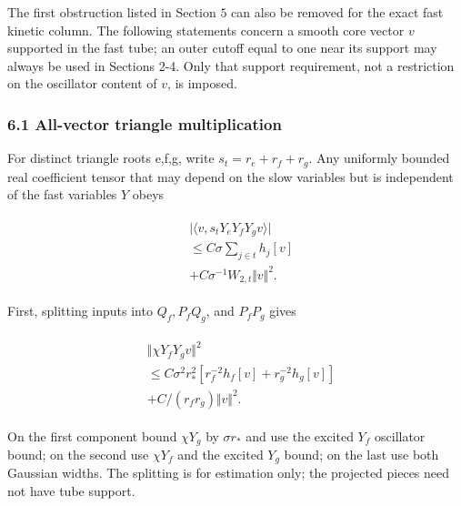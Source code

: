 The first obstruction listed in Section \(5\) can also be removed for
the exact fast kinetic column. The following statements concern a smooth
core vector \(v\) supported in the fast tube; an outer cutoff equal to
one near its support may always be used in Sections 2-4. Only that
support requirement, not a restriction on the oscillator content of
\(v\), is imposed.

\subsubsection{6.1 All-vector triangle
multiplication}\label{e-all-vector-triangle-multiplication}

For distinct triangle roots e,f,g, write \(s_{t}=r_{e}+r_{f}+r_{g}\).
Any uniformly bounded real coefficient tensor that may depend on the
slow variables but is independent of the fast variables \(Y\) obeys

\begin{gather*}
\begin{aligned}
& \vert \langle v,s_{t} Y_{e} Y_{f} Y_{g} v\rangle \vert \\
& \le  C \sigma  \sum _{j \in  t} h_{j}[v] \\
& + C \sigma ^{-1} W_{2,t} \Vert v\Vert ^{2}.
\end{aligned}\tag{17}
\end{gather*}

First, splitting inputs into \(Q_{f}, P_{f} Q_{g}\), and \(P_{f} P_{g}\)
gives

\begin{gather*}
\begin{aligned}
& \Vert \chi  Y_{f} Y_{g} v\Vert ^{2} \\
& \le  C \sigma ^{2} r_{*}^{2} [r_{f}^{-2} h_{f}[v]+r_{g}^{-2} h_{g}[v]] \\
& + C/(r_{f} r_{g}) \Vert v\Vert ^{2}.
\end{aligned}\tag{18}
\end{gather*}

On the first component bound \(\chi  Y_{g}\) by \(\sigma  r_{*}\) and
use the excited \(Y_{f}\) oscillator bound; on the second use
\(\chi  Y_{f}\) and the excited \(Y_{g}\) bound; on the last use both
Gaussian widths. The splitting is for estimation only; the projected
pieces need not have tube support.

